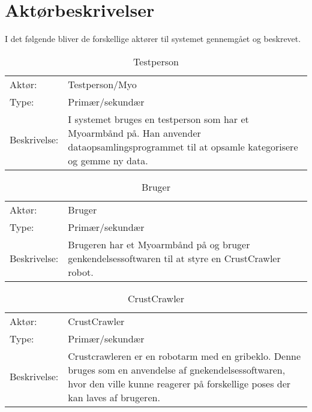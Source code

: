\thispagestyle{fancy}
\chapter{Aktørbeskrivelser}
\label{chp:aktorbeskrivelser}
I det følgende bliver de forskellige aktører til systemet gennemgået og beskrevet.
\bgroup
\def\arraystretch{1.8}
\begin{center}
	\begin{table}[htbp]
		\begin{tabular}{lp{10cm}}
			\rowcolor{grey} Aktør:		& Testperson/Myo \\
			Type: 	& Primær/sekundær \\
			Beskrivelse:				& I systemet bruges en testperson som har et Myoarmbånd på. Han anvender dataopsamlingsprogrammet til at opsamle kategorisere og gemme ny data.
		\end{tabular}
		\caption{Testperson}
	\end{table}
\end{center}

\begin{center}
	\begin{table}[htbp]
		\begin{tabular}{lp{10cm}}
			\rowcolor{grey} Aktør:		& Bruger \\
			Type: 	& Primær/sekundær \\
			Beskrivelse:				& Brugeren har et Myoarmbånd på og bruger genkendelsessoftwaren til at styre en CrustCrawler robot.
		\end{tabular}
		\caption{Bruger}
	\end{table}
\end{center}

\begin{center}
	\begin{table}[htbp]
		\begin{tabular}{lp{10cm}}
			\rowcolor{grey} Aktør:		& CrustCrawler \\
			Type: 	& Primær/sekundær \\
			Beskrivelse:				& Crustcrawleren er en robotarm med en gribeklo. Denne bruges som en anvendelse af gnekendelsessoftwaren, hvor den ville kunne reagerer på forskellige poses der kan laves af brugeren.
		\end{tabular}
		\caption{CrustCrawler}
	\end{table}
\end{center}
\egroup